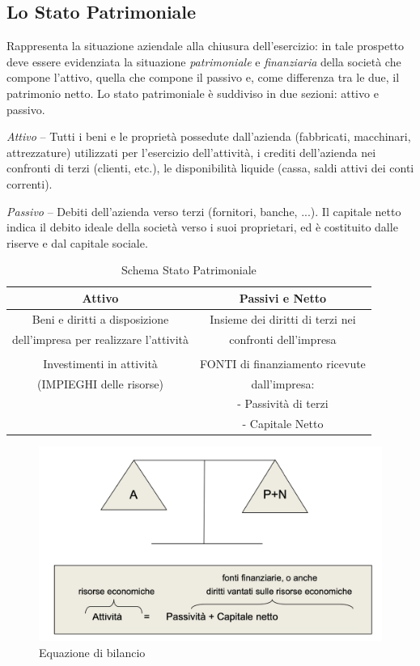 \subsection{Lo Stato Patrimoniale}
Rappresenta la situazione aziendale alla chiusura dell’esercizio: in tale prospetto deve essere evidenziata la situazione \textit{patrimoniale} e \textit{finanziaria} della società che compone l’attivo, quella che compone il passivo e, come differenza tra le due, il patrimonio netto. Lo stato patrimoniale è suddiviso in due sezioni: attivo e passivo.

\textit{Attivo} – Tutti i beni e le proprietà possedute dall’azienda (fabbricati, macchinari, attrezzature) utilizzati per l’esercizio dell’attività, i crediti dell’azienda nei confronti di terzi (clienti, etc.), le disponibilità liquide (cassa, saldi attivi dei conti correnti).

\textit{Passivo} – Debiti dell’azienda verso terzi (fornitori, banche, ...). Il capitale netto indica il debito ideale della società verso i suoi proprietari, ed è costituito dalle riserve e dal capitale sociale.

\begin{table}[H]
	\begin{tabular}{| c | c |}
		\hline
		 Attivo & Passivi e Netto \\
		 \hline
		 Beni e diritti a disposizione & Insieme dei diritti di terzi nei \\
		 dell’impresa per realizzare l’attività &  confronti dell’impresa \\
		 & \\
		 Investimenti in attività & FONTI di finanziamento ricevute \\
		 (IMPIEGHI delle risorse) &  dall’impresa: \\ 
		 & - Passività di terzi \\ 
		 & - Capitale Netto \\
		 \hline
	\end{tabular}
	\centering
	\caption{Schema Stato Patrimoniale}
\end{table}

\begin{figure}[H]
	\includegraphics[width=0.8\linewidth]{resources/chapters/Bilancio/images/equazione-bilancio.png}
	\centering
	\caption{Equazione di bilancio}
\end{figure}

